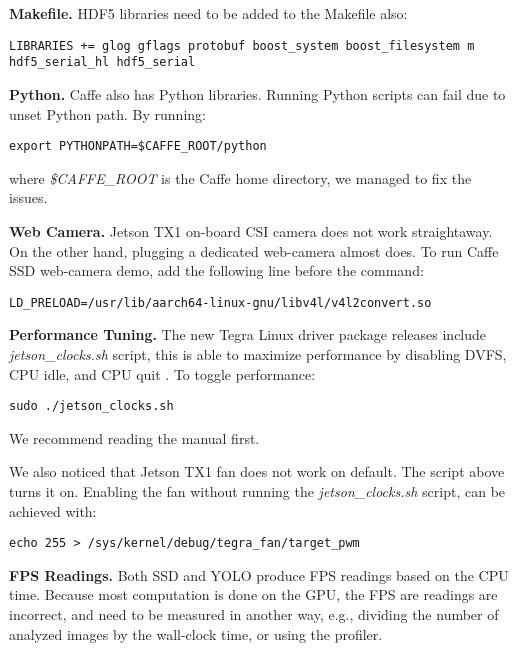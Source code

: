\textbf{Makefile.}
HDF5 libraries need to be added to the Makefile also:
\begin{lstlisting} 
LIBRARIES += glog gflags protobuf boost_system boost_filesystem m hdf5_serial_hl hdf5_serial
\end{lstlisting}

\textbf{Python.}
Caffe also has Python libraries. Running Python scripts can fail due to unset Python path. By running:
\begin{lstlisting} 
export PYTHONPATH=$CAFFE_ROOT/python
\end{lstlisting}
where \textit{\$CAFFE\_ROOT} is the Caffe home directory, we managed to fix the issues.

\textbf{Web Camera.}
Jetson TX1 on-board CSI camera does not work straightaway. On the other hand, plugging a dedicated web-camera almost does. To run Caffe SSD web-camera demo, add the following line before the command:
\begin{lstlisting} 
LD_PRELOAD=/usr/lib/aarch64-linux-gnu/libv4l/v4l2convert.so
\end{lstlisting}

\textbf{Performance Tuning.}
The new Tegra Linux driver package releases include \textit{jetson\_clocks.sh} script, this is able to maximize performance by disabling DVFS, CPU idle, and CPU quit \cite{tegradriverpack242}. To toggle performance:
\begin{lstlisting} 
sudo ./jetson_clocks.sh
\end{lstlisting}
We recommend reading the manual first.

We also noticed that Jetson TX1 fan does not work on default. The script above turns it on. Enabling the fan without running the \textit{jetson\_clocks.sh} script, can be achieved with:
\begin{lstlisting} 
echo 255 > /sys/kernel/debug/tegra_fan/target_pwm
\end{lstlisting}

\textbf{FPS Readings.}
Both SSD and YOLO produce FPS readings based on the CPU time. Because most computation is done on the GPU, the FPS are readings are incorrect, and need to be measured in another way, e.g., dividing the number of analyzed images by the wall-clock time, or using the profiler.
